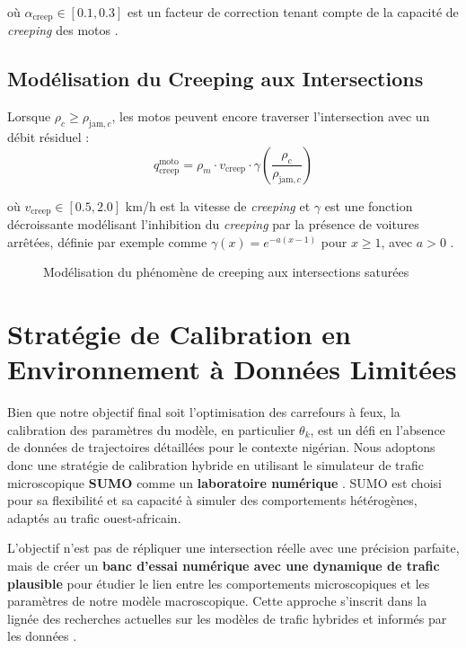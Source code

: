 où $ \alpha_{\text{creep}} \in [0.1, 0.3] $ est un facteur de correction tenant compte de la capacité de \textit{creeping} des motos \cite{FanWork2015}.

\subsection{Modélisation du Creeping aux Intersections}
Lorsque $ \rho_c \geq \rho_{\text{jam},c} $, les motos peuvent encore traverser l'intersection avec un débit résiduel :
\[
q_{\text{creep}}^{\text{moto}} = \rho_m \cdot v_{\text{creep}} \cdot \gamma\left(\frac{\rho_c}{\rho_{\text{jam},c}}\right)
\]

où $ v_{\text{creep}} \in [0.5, 2.0] $ km/h est la vitesse de \textit{creeping} et $ \gamma $ est une fonction décroissante modélisant l'inhibition du \textit{creeping} par la présence de voitures arrêtées, définie par exemple comme $ \gamma(x) = e^{-a(x-1)} $ pour $ x \geq 1 $, avec $ a > 0 $ \cite{FanWork2015}.

\begin{figure}[htbp]
\centering
\caption{Modélisation du phénomène de creeping aux intersections saturées}
\label{fig:creeping_intersection}
\end{figure}

\section{Stratégie de Calibration en Environnement à Données Limitées}
Bien que notre objectif final soit l'optimisation des carrefours à feux, la calibration des paramètres du modèle, en particulier $ \theta_k $, est un défi en l'absence de données de trajectoires détaillées pour le contexte nigérian. Nous adoptons donc une stratégie de calibration hybride en utilisant le simulateur de trafic microscopique \textbf{SUMO} comme un \textbf{laboratoire numérique} \cite{KrajzewiczEtAl2012}. SUMO est choisi pour sa flexibilité et sa capacité à simuler des comportements hétérogènes, adaptés au trafic ouest-africain.

L'objectif n'est pas de répliquer une intersection réelle avec une précision parfaite, mais de créer un \textbf{banc d'essai numérique avec une dynamique de trafic plausible} pour étudier le lien entre les comportements microscopiques et les paramètres de notre modèle macroscopique. Cette approche s'inscrit dans la lignée des recherches actuelles sur les modèles de trafic hybrides et informés par les données \cite{HertyKolbe2022, CanepaHerty2017}.

